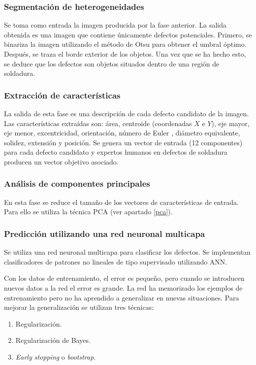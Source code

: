 \subsubsection{Segmentación de heterogeneidades}
Se toma como entrada la imagen producida por la fase anterior. 
La salida obtenida es una imagen que contiene únicamente defectos potenciales.
Primero, se binariza la imagen utilizando el método de Otsu para obtener el umbral óptimo. Después, se traza el borde exterior de los objetos. Una vez que se ha hecho esto, se deduce que los defectos son objetos situados dentro de una región de soldadura.


\subsubsection{Extracción de características}
La salida de esta fase es una descripción de cada defecto candidato de la imagen. Las características extraídas son: área, centroide (coordenadas $X$ e $Y$), eje mayor, eje menor, excentricidad, orientación, número de Euler \cite{dunham1999euler}, diámetro equivalente, solidez, extensión y posición. Se genera un vector de entrada (12 componentes) para cada defecto candidato y expertos humanos en defectos de soldadura producen un vector objetivo asociado.


\subsubsection{Análisis de componentes principales}
En esta fase se reduce el tamaño de los vectores de características de entrada. Para ello se utiliza la técnica PCA \cite{PCA} (ver apartado \ref{pca}).


\subsubsection{Predicción utilizando una red neuronal multicapa}
Se utiliza una red neuronal multicapa para clasificar los defectos.
Se implementan clasificadores de patrones no lineales de tipo supervisado utilizando ANN.

Con los datos de entrenamiento, el error es pequeño, pero cuando se introducen nuevos datos a la red el error es grande. La red ha memorizado los ejemplos de entrenamiento pero no ha aprendido a generalizar en nuevas situaciones. Para mejorar la generalización se utilizan tres técnicas:
	\begin{enumerate}
	\item Regularización.
	\item Regularización de Bayes.
	\item \emph{Early stopping} o \emph{bootstrap}.
	\end{enumerate}

